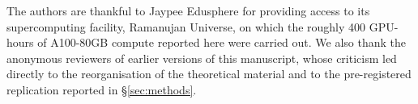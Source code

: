 %

The authors are thankful to Jaypee Edusphere for providing access to its
supercomputing facility, Ramanujan Universe, on which the roughly 400
GPU-hours of A100-80GB compute reported here were carried out. We also thank
the anonymous reviewers of earlier versions of this manuscript, whose
criticism led directly to the reorganisation of the theoretical material and
to the pre-registered replication reported in \S\ref{sec:methods}.
